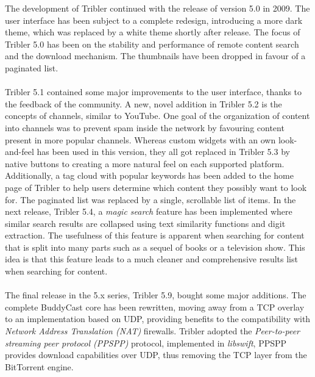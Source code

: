 The development of Tribler continued with the release of version 5.0 in 2009\cite{historyoftribler}. The user interface has been subject to a complete redesign, introducing a more dark theme, which was replaced by a white theme shortly after release. The focus of Tribler 5.0 has been on the stability and performance of remote content search and the download mechanism. The thumbnails have been dropped in favour of a paginated list.\\\\
Tribler 5.1 contained some major improvements to the user interface, thanks to the feedback of the community. A new, novel addition in Tribler 5.2 is the concepts of channels, similar to YouTube. One goal of the organization of content into channels was to prevent spam inside the network by favouring content present in more popular channels. Whereas custom widgets with an own look-and-feel has been used in this version, they all got replaced in Tribler 5.3 by native buttons to creating a more natural feel on each supported platform. Additionally, a tag cloud with popular keywords has been added to the home page of Tribler to help users determine which content they possibly want to look for. The paginated list was replaced by a single, scrollable list of items. In the next release, Tribler 5.4, a \emph{magic search} feature has been implemented where similar search results are collapsed using text similarity functions and digit extraction. The usefulness of this feature is apparent when searching for content that is split into many parts such as a sequel of books or a television show. This idea is that this feature leads to a much cleaner and comprehensive results list when searching for content.\\\\
The final release in the 5.x series, Tribler 5.9, bought some major additions. The complete BuddyCast core has been rewritten, moving away from a TCP overlay to an implementation based on UDP, providing benefits to the compatibility with \emph{Network Address Translation (NAT)} firewalls. Tribler adopted the \emph{Peer-to-peer streaming peer protocol (PPSPP)} protocol\cite{bakker2015peer}, implemented in \emph{libswift}, PPSPP provides download capabilities over UDP, thus removing the TCP layer from the BitTorrent engine.\\\\
